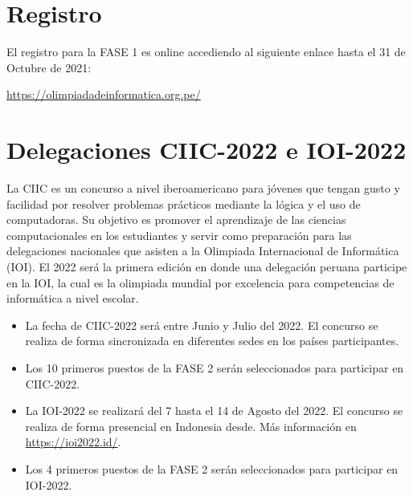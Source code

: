\documentclass{article}
\begin{document}
\section{Registro}

El registro para la FASE 1 es online accediendo al siguiente enlace
{\color{red} hasta el 31 de Octubre de 2021}:

\begin{center}
\url{https://olimpiadadeinformatica.org.pe/}
\end{center}

\section{Delegaciones CIIC-2022 e IOI-2022}

La CIIC es un concurso a nivel iberoamericano para jóvenes que tengan gusto y facilidad por resolver problemas prácticos mediante la lógica y el uso de computadoras. Su objetivo es promover el aprendizaje de las ciencias computacionales en los estudiantes y servir como preparación para las delegaciones nacionales que asisten a la Olimpiada Internacional de Informática (IOI).
El 2022 será la primera edición en donde una delegación peruana participe en la IOI, la cual es la olimpiada mundial por excelencia para competencias de informática a nivel escolar.

\begin{itemize}
\item 
La fecha de CIIC-2022 será entre Junio y Julio del 2022.
El concurso se realiza de forma sincronizada en diferentes sedes en los países participantes.

\item Los 10 primeros puestos de la FASE 2 serán seleccionados para participar en CIIC-2022.


\item 
La IOI-2022 se realizará del 7 hasta el 14 de Agosto del 2022.
El concurso se realiza de forma presencial en  Indonesia desde. Más información en
\url{https://ioi2022.id/}.

\item Los 4 primeros puestos de la FASE 2 serán seleccionados para participar en IOI-2022.





\end{itemize}
\end{document}
